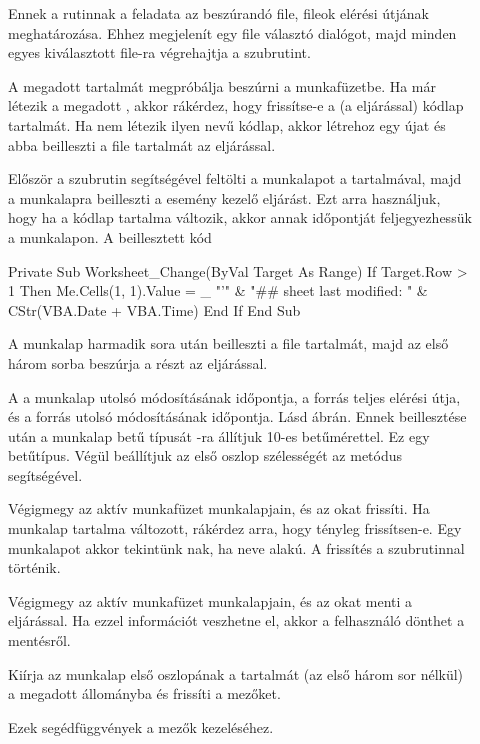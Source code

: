 \begin{description}
\item[] Ennek a rutinnak a feladata az beszúrandó
   file, fileok elérési útjának meghatározása. Ehhez
  megjelenít egy file választó dialógot, majd minden egyes
  kiválasztott file-ra végrehajtja a  szubrutint.
\item[] A megadott
   tartalmát megpróbálja beszúrni a 
  munkafüzetbe. Ha már 
  létezik a megadott , akkor rákérdez, hogy 
  frissítse-e a (a  eljárással) kódlap tartalmát. Ha
  nem létezik ilyen nevű kódlap, akkor létrehoz egy újat és abba
  beilleszti a file tartalmát az  eljárással. 
\item[]
  Először a  szubrutin segítségével feltölti a
   munkalapot a  tartalmával, majd a munkalapra
  beilleszti a  esemény kezelő eljárást. Ezt
  arra használjuk, hogy ha a kódlap 
  tartalma változik, akkor annak időpontját feljegyezhessük a
  munkalapon. A beillesztett kód
\begin{VBAframe}
Private Sub Worksheet_Change(ByVal Target As Range)
  If Target.Row > 1 Then
    Me.Cells(1, 1).Value = _
      "'" & "## sheet last modified: " & CStr(VBA.Date + VBA.Time)
  End If
End Sub
\end{VBAframe}
\item[] A munkalap harmadik sora után beilleszti a
  file tartalmát, majd az első három sorba beszúrja a  részt
  az  eljárással. 
\item[] A  a munkalap utolsó
  módosításának időpontja, a forrás teljes 
  elérési útja, és a forrás utolsó módosításának időpontja. Lásd
   ábrán. Ennek beillesztése után a munkalap betű
  típusát -ra állítjuk 10-es betűmérettel. Ez 
  egy  betűtípus. Végül beállítjuk az első oszlop
  szélességét az  metódus segítségével.
\item[] Végigmegy az aktív munkafüzet
  munkalapjain, és az okat frissíti. Ha munkalap
  tartalma változott, rákérdez arra, hogy tényleg frissítsen-e. Egy
  munkalapot akkor tekintünk nak, ha neve  alakú. A frissítés a 
  szubrutinnal történik. 
\item[] Végigmegy az aktív munkafüzet
  munkalapjain, és az okat menti 
  a  eljárással. Ha ezzel információt veszhetne el,
  akkor a felhasználó dönthet 
  a mentésről.
\item[] Kiírja az 
  munkalap első oszlopának a tartalmát (az első három sor nélkül) a
  megadott  állományba és frissíti a  mezőket. 
\item[] Ezek segédfüggvények a  mezők
  kezeléséhez. 
\end{description}


